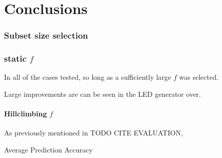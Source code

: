 \chapter{Conclusions}

\subsection{Subset size selection}
\subsection{static $f$}
In all of the cases tested, so long as a sufficiently large $f$ was selected. 

Large improvements are can be seen in the LED generator over.

\subsubsection{Hillclimbing $f$}
As previously mentioned in TODO CITE EVALUATION, 

\begin{center}
Average Prediction Accuracy

\end{center}